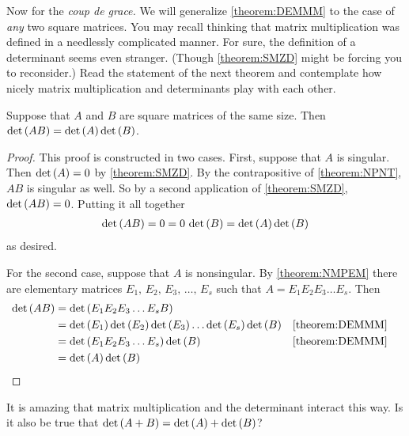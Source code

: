 \documentclass{ximera}
\begin{document}
Now for the \textit{coup de grace.}  We will generalize
\ref{theorem:DEMMM} to the case of \textit{any} two square matrices.
You may recall thinking that matrix multiplication was defined in a
needlessly complicated manner.  For sure, the definition of a
determinant seems even stranger.  (Though \ref{theorem:SMZD} might be
forcing you to reconsider.)  Read the statement of the next theorem
and contemplate how nicely matrix multiplication and determinants play
with each other.

\begin{theorem}
\label{theorem:DRMM}

Suppose that $A$ and $B$ are square matrices of the same size.  Then
$\det\left(AB\right)=\det\left(A\right)\det\left(B\right)$.

\begin{proof}
  This proof is constructed in two cases.  First, suppose that $A$ is
  singular.  Then $\det\left(A\right)=0$ by \ref{theorem:SMZD}.  By the
  contrapositive of \ref{theorem:NPNT}, $AB$ is singular as well.  So
  by a second application of \ref{theorem:SMZD}, $\det\left(AB\right)=0$.
  Putting it all together
  \begin{align*}
    \det\left(AB\right)=0=0\,\det\left(B\right)=\det\left(A\right)\det\left(B\right)
  \end{align*}
  as desired.

  For the second case, suppose that $A$ is nonsingular.  By
  \ref{theorem:NMPEM} there are elementary matrices
  $E_{1},\,E_{2},\,E_{3},\,\dots,\,E_{s}$ such that
  $A=E_1E_2E_3\dots E_s$.  Then
  \begin{align*}
    \det\left(AB\right)
    &=
      \det\left(E_1E_2E_3\dots E_{s}B\right)\\
    &=
      \det\left(E_1\right)\det\left(E_2\right)\det\left(E_3\right)\dots\det\left(E_s\right)\det\left(B\right)
    &&\ref{theorem:DEMMM}\\
    &=
      \det\left(E_1E_2E_3\dots E_s\right)\det\left(B\right)
    &&\ref{theorem:DEMMM}\\
    &=
      \det\left(A\right)\det\left(B\right)
  \end{align*}
\end{proof}
\end{theorem}

\begin{question}
  It is amazing that matrix multiplication and the determinant
  interact this way.  Is it also be true that
  $\det\left(A+B\right)=\det\left(A\right)+\det\left(B\right)$?
  
  \begin{multipleChoice}
  \end{multipleChoice}
\end{question}
\end{document}
